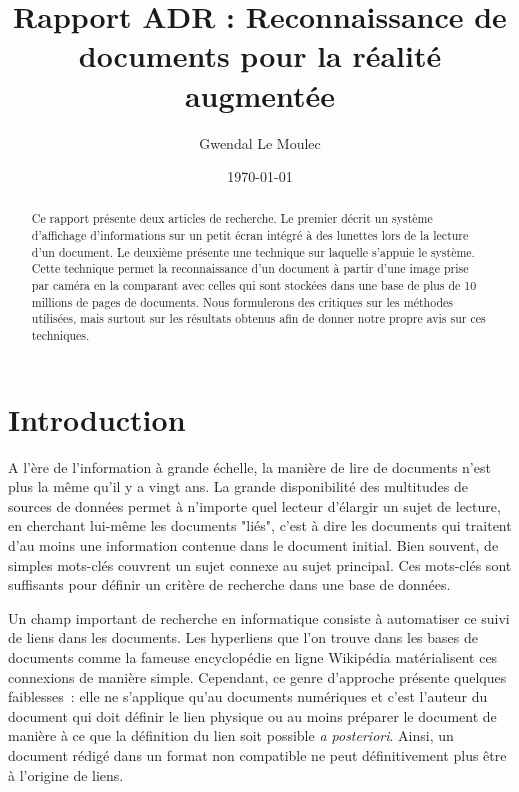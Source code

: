 \documentclass[a4paper]{article}
\title{Rapport ADR : Reconnaissance de documents pour la réalité augmentée}
\author{Gwendal Le Moulec}
\date{\today}
\begin{document}
\maketitle

\begin{abstract}
Ce rapport présente deux articles de recherche. Le premier décrit un système d'affichage d'informations sur un petit écran intégré à des lunettes lors de la lecture d'un document. Le deuxième présente une technique sur laquelle s'appuie le système. Cette technique  permet la reconnaissance d'un document à partir d'une image prise par caméra en la comparant avec celles qui sont stockées dans une base de plus de 10 millions de pages de documents. Nous formulerons des critiques sur les méthodes utilisées, mais surtout sur les résultats obtenus afin de donner notre propre avis sur ces techniques.
\end{abstract}

\section{Introduction}

A l'ère de l'information à grande échelle, la manière de lire de documents n'est plus la même qu'il y a vingt ans. La grande disponibilité des multitudes de sources de données permet à n'importe quel lecteur d'élargir un sujet de lecture, en cherchant lui-même les documents "liés", c'est à dire les documents qui traitent d'au moins une information contenue dans le document initial. Bien souvent, de simples mots-clés couvrent un sujet connexe au sujet principal. Ces mots-clés sont suffisants pour définir un critère de recherche dans une base de données.

Un champ important de recherche en informatique consiste à automatiser ce suivi de liens dans les documents. Les hyperliens que l'on trouve dans les bases de documents comme la fameuse encyclopédie en ligne Wikipédia matérialisent ces connexions de manière simple. Cependant, ce genre d'approche présente quelques faiblesses~: elle ne s'applique qu'au documents numériques et c'est l'auteur du document qui doit définir le lien physique ou au moins préparer le document de manière à ce que la définition du lien soit possible \textit{a posteriori}. Ainsi, un document rédigé dans un format non compatible ne peut définitivement plus être à l'origine de liens.
\end{document}
